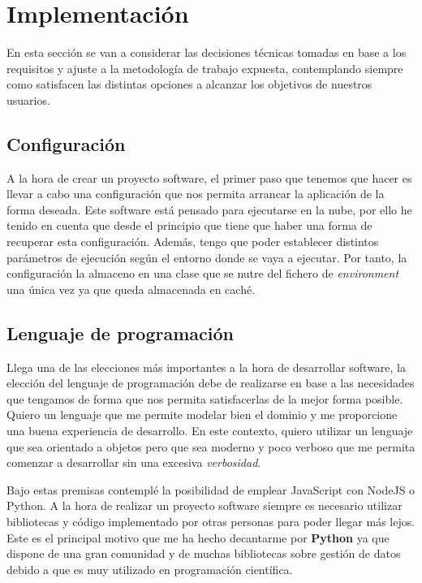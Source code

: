 \section{Implementación}
En esta sección se van a considerar las decisiones técnicas tomadas en base a los requisitos y ajuste a la metodología de trabajo expuesta, contemplando siempre como satisfacen las distintas opciones a alcanzar los objetivos de nuestros usuarios.

\subsection{Configuración}
A la hora de crear un proyecto software, el primer paso que tenemos que hacer es llevar a cabo una configuración que nos permita arrancar la aplicación de la forma deseada. Este software está pensado para ejecutarse en la nube, por ello he tenido en cuenta que desde el principio que tiene que haber una forma de recuperar esta configuración. Además, tengo que poder establecer distintos parámetros de ejecución según el entorno donde se vaya a ejecutar. Por tanto, la configuración la almaceno en una clase que se nutre del fichero de \textit{environment} una única vez ya que queda almacenada en caché. 

\subsection{Lenguaje de programación}
Llega una de las elecciones más importantes a la hora de desarrollar software, la elección del lenguaje de programación
debe de realizarse en base a las necesidades que tengamos de forma que nos permita satisfacerlas de la mejor forma posible.
Quiero un lenguaje que me permite modelar bien el dominio y me proporcione una buena experiencia de desarrollo. En este contexto,
quiero utilizar un lenguaje que sea orientado a objetos pero que sea moderno y poco verboso que me permita comenzar a desarrollar
sin una excesiva \textit{verbosidad}.

Bajo estas premisas contemplé la posibilidad de emplear JavaScript con NodeJS o Python. A la hora de realizar un proyecto
software siempre es necesario utilizar bibliotecas y código implementado por otras personas para poder llegar más lejos.
Este es el principal motivo que me ha hecho decantarme por \textbf{Python} ya que dispone de una gran comunidad
y de muchas bibliotecas sobre gestión de datos debido a que es muy utilizado en programación científica.

